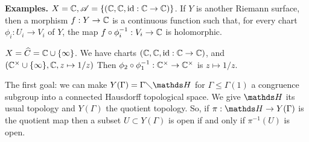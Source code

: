 \documentclass[10pt,a4paper]{article}
\begin{document}
\textbf{Examples.} $X = \mathbb{C}, \mathscr{A} = \{(\mathbb{C}, \mathbb{C}, \operatorname{id}:\mathbb{C} \to \mathbb{C})\}$. If $Y$ is another Riemann surface, then a morphism $f:Y \to \mathbb{C}$ is a continuous function such that, for every chart $\phi_i : U_i \to V_i$ of $Y$, the map $f \circ \phi_i^{-1}:V_i \to \mathbb{C}$ is holomorphic.

$X = \widehat{C} = \mathbb{C} \cup \{\infty\}$. We have charts $(\mathbb{C}, \mathbb{C}, \operatorname{id}:\mathbb{C}\to\mathbb{C})$, and $(\mathbb{C}^\times \cup \{\infty\}, \mathbb{C}, z\mapsto 1/z)$ Then $\phi_2 \circ \phi_1^{-1}:\mathbb{C}^\times \to \mathbb{C}^\times$ is $z \mapsto 1/z$.

The first goal: we can make $Y(\Gamma) = \Gamma \diagdown \H$ for $\Gamma \leq \Gamma(1)$ a congruence subgroup into a connected Hausdorff topological space. We give $\H$ its usual topology and $Y(\Gamma)$ the quotient topology. So, if $\pi: \H \to Y(\Gamma)$ is the quotient map then a subset $U \subset Y(\Gamma)$ is open if and only if $\pi^{-1}(U)$ is open.
\end{document}
